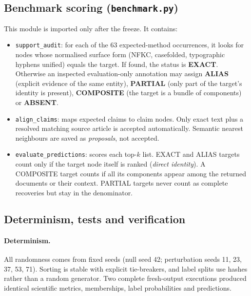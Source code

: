 \documentclass[11pt,a4paper]{article}
\theoremstyle{remark}
\newcommand{\code}[1]{\texttt{\small #1}}
\begin{document}
\subsection{Benchmark scoring (\code{benchmark.py})}

This module is imported only after the freeze. It contains:

\begin{itemize}
  \item \code{support\_audit}: for each of the 63 expected-method occurrences, it looks for
        nodes whose normalised surface form (NFKC, casefolded, typographic hyphens unified)
        equals the target. If found, the status is \textbf{EXACT}. Otherwise an inspected
        evaluation-only annotation may assign \textbf{ALIAS} (explicit evidence of the same
        entity), \textbf{PARTIAL} (only part of the target's identity is present),
        \textbf{COMPOSITE} (the target is a bundle of components) or \textbf{ABSENT}.
  \item \code{align\_claims}: maps expected claims to claim nodes. Only exact text plus a
        resolved matching source article is accepted automatically. Semantic nearest
        neighbours are saved as \emph{proposals}, not accepted.
  \item \code{evaluate\_predictions}: scores each top-$k$ list. EXACT and ALIAS targets
        count only if the target node itself is ranked (\emph{direct identity}). A COMPOSITE
        target counts if all its components appear among the returned documents or their
        context. PARTIAL targets never count as complete recoveries but stay in the
        denominator.
\end{itemize}

\subsection{Determinism, tests and verification}

\paragraph{Determinism.}
All randomness comes from fixed seeds (null seed 42; perturbation seeds 11, 23, 37, 53, 71).
Sorting is stable with explicit tie-breakers, and label splits use hashes rather than a
random generator. Two complete fresh-output executions produced identical scientific
metrics, memberships, label probabilities and predictions.
\end{document}
